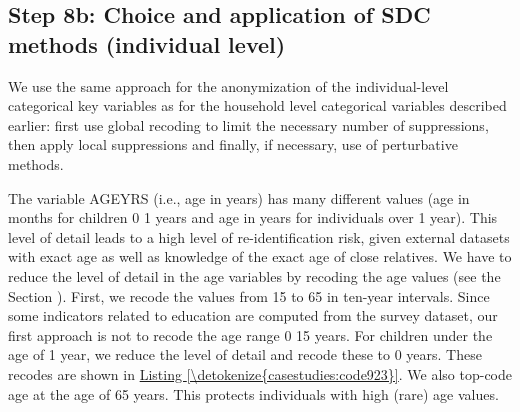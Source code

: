 \documentclass[letterpaper,10pt,english]{sphinxmanual}
\begin{document}
\subsection{Step 8b: Choice and application of SDC methods (individual level)}
\label{\detokenize{casestudies:step-8b-choice-and-application-of-sdc-methods-individual-level}}
We use the same approach for the anonymization of the individual-level
categorical key variables as for the household level categorical
variables described earlier: first use global recoding to limit the
necessary number of suppressions, then apply local suppressions and
finally, if necessary, use of perturbative methods.

The variable AGEYRS (i.e., age in years) has many different values (age
in months for children 0 \textendash{} 1 years and age in years for individuals over
1 year). This level of detail leads to a high level of re-identification
risk, given external datasets with exact age as well as knowledge of the
exact age of close relatives. We have to reduce the level of detail in
the age variables by recoding the age values (see the Section
 ). First, we recode the values from 15 to 65 in ten-year
intervals. Since some indicators related to education are computed from
the survey dataset, our first approach is not to recode the age range 0
\textendash{} 15 years. For children under the age of 1 year, we reduce the level of
detail and recode these to 0 years. These recodes are shown in \hyperref[\detokenize{casestudies:code923}]{Listing \ref{\detokenize{casestudies:code923}}}.
We also top-code age at the age of 65 years. This protects
individuals with high (rare) age values.
\end{document}
